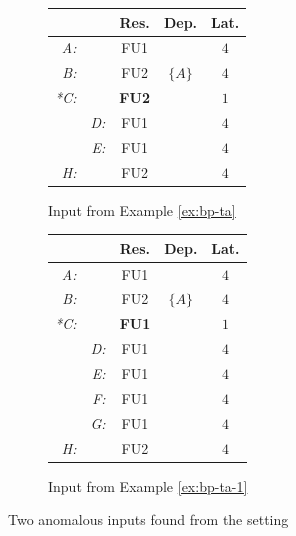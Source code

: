 \begin{figure}[H]
    \centering
    \begin{subfigure}[b]{0.45\textwidth}
        \centering
        \begin{tabular}{rr|ccc}
            &  & Res. & Dep. & Lat. \\ \hline
            \textit{A:} &  & FU1 &  & $4$ \\
            \textit{B:} &  & FU2 & $\{A\}$ & $4$ \\
            \textit{*C:} &  & \textbf{FU2} &  & $1$ \\
            & \textit{D:} & FU1 &  & $4$ \\
            & \textit{E:} & FU1 &  & $4$ \\
            \textit{H:} &  & FU2 &  & $4$ \\
        \end{tabular}
        \caption{Input from Example \ref{ex:bp-ta}}
        \label{fig:bp-ta-inputs-0}
    \end{subfigure}
    \hfill
    \begin{subfigure}[b]{0.45\textwidth}
        \centering
        
        \begin{tabular}{rr|ccc}
            &  & Res. & Dep. & Lat. \\ \hline
            \textit{A:} &  & FU1 &  & $4$ \\
            \textit{B:} &  & FU2 & $\{A\}$ & $4$ \\
            \textit{*C:} &  & \textbf{FU1} &  & $1$ \\
            & \textit{D:} & FU1 &  & $4$ \\
            & \textit{E:} & FU1 &  & $4$ \\
            & \textit{F:} & FU1 &  & $4$ \\
            & \textit{G:} & FU1 &  & $4$ \\
            \textit{H:} &  & FU2 &  & $4$ \\
        \end{tabular}
        \caption{Input from Example \ref{ex:bp-ta-1}}
        \label{fig:bp-ta-inputs-1}
    \end{subfigure}
    \caption{Two anomalous inputs found from the setting}
    \label{fig:bp-ta-inputs}
\end{figure}




